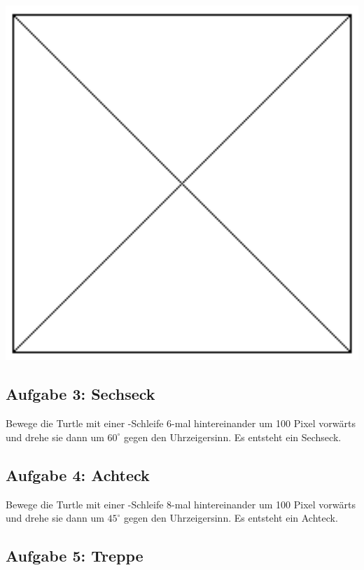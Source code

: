 \begin{minipage}{0.2\textwidth}
\includegraphics[width=1.0\textwidth]{./inf/SEKII/05_Java_TurtleGrafik/Aufgabe2b.png}
\end{minipage}


\subsection{Aufgabe 3: Sechseck}

Bewege die Turtle mit einer -Schleife 6-mal hintereinander um
100 Pixel vorwärts und drehe sie dann um $60^\circ$ gegen den Uhrzeigersinn. Es
entsteht ein Sechseck.


\subsection{Aufgabe 4: Achteck}

Bewege die Turtle mit einer -Schleife 8-mal hintereinander um
100 Pixel vorwärts und drehe sie dann um $45^\circ$ gegen den Uhrzeigersinn. Es
entsteht ein Achteck.


\subsection{Aufgabe 5: Treppe}

